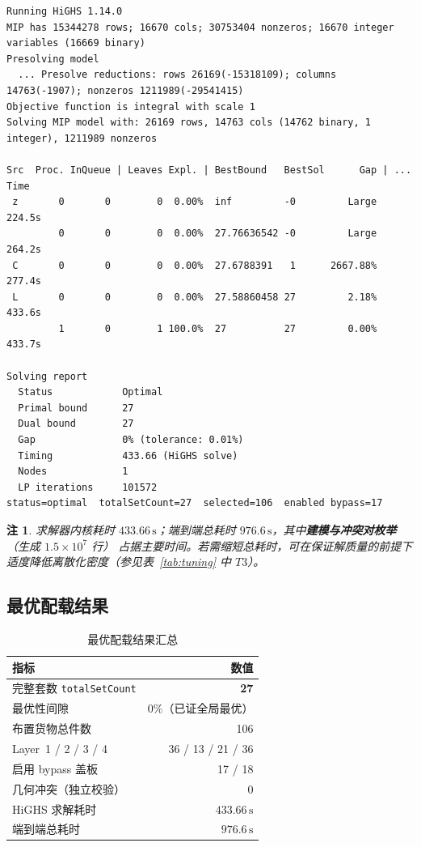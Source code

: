 \documentclass[11pt]{article}
\newcommand{\unit}[1]{\,\mathrm{#1}}
\newtheorem{remark}{注}
\begin{document}
\begin{lstlisting}[style=solverlog]
Running HiGHS 1.14.0
MIP has 15344278 rows; 16670 cols; 30753404 nonzeros; 16670 integer variables (16669 binary)
Presolving model
  ... Presolve reductions: rows 26169(-15318109); columns 14763(-1907); nonzeros 1211989(-29541415)
Objective function is integral with scale 1
Solving MIP model with: 26169 rows, 14763 cols (14762 binary, 1 integer), 1211989 nonzeros

Src  Proc. InQueue | Leaves Expl. | BestBound   BestSol      Gap | ... Time
 z       0       0        0  0.00%  inf         -0         Large       224.5s
         0       0        0  0.00%  27.76636542 -0         Large       264.2s
 C       0       0        0  0.00%  27.6788391   1      2667.88%       277.4s
 L       0       0        0  0.00%  27.58860458 27         2.18%       433.6s
         1       0        1 100.0%  27          27         0.00%       433.7s

Solving report
  Status            Optimal
  Primal bound      27
  Dual bound        27
  Gap               0% (tolerance: 0.01%)
  Timing            433.66 (HiGHS solve)
  Nodes             1
  LP iterations     101572
status=optimal  totalSetCount=27  selected=106  enabled bypass=17
\end{lstlisting}

\begin{remark}
求解器内核耗时 $433.66\unit{s}$；端到端总耗时 $976.6\unit{s}$，其中\textbf{建模与冲突对枚举}（生成 $1.5\times10^7$ 行）
占据主要时间。若需缩短总耗时，可在保证解质量的前提下适度降低离散化密度（参见表~\ref{tab:tuning} 中 $T3$）。
\end{remark}

\subsection{最优配载结果}
\begin{table}[ht]
\centering
\caption{最优配载结果汇总}
\label{tab:result}
\begin{tabular}{lr}
\toprule
指标 & 数值 \\
\midrule
完整套数 \texttt{totalSetCount} & \textbf{27} \\
最优性间隙 & $0\%$（已证全局最优）\\
布置货物总件数 & 106 \\
\quad Layer~1 / 2 / 3 / 4 & 36 / 13 / 21 / 36 \\
启用 bypass 盖板 & 17 / 18 \\
几何冲突（独立校验） & 0 \\
HiGHS 求解耗时 & $433.66\unit{s}$ \\
端到端总耗时 & $976.6\unit{s}$ \\
\bottomrule
\end{tabular}
\end{table}
\end{document}
